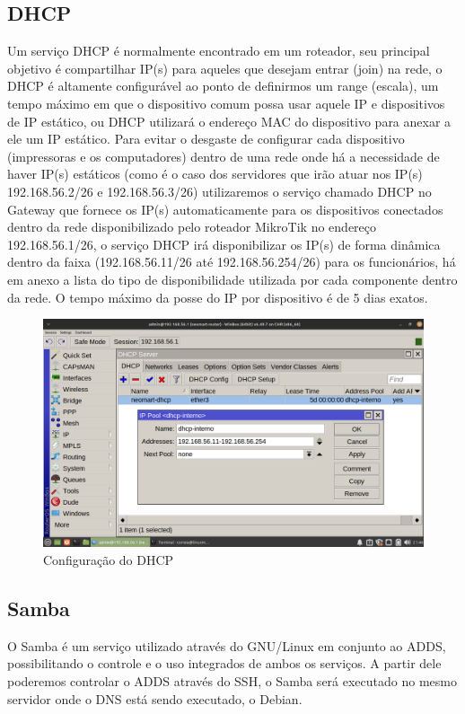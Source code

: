 \documentclass[12pt]{article}
\begin{document}
\subsection{DHCP}
Um serviço DHCP é normalmente encontrado em um roteador, seu principal objetivo é compartilhar IP(s) para aqueles que desejam entrar (join) na rede, o DHCP é altamente configurável ao ponto de definirmos um range (escala), um tempo máximo em que o dispositivo comum possa usar aquele IP e dispositivos de IP estático, ou DHCP utilizará o endereço MAC do dispositivo para anexar a ele um IP estático.
Para evitar o desgaste de configurar cada dispositivo (impressoras e os computadores) dentro de uma rede onde há a necessidade de haver IP(s) estáticos (como é o caso dos servidores que irão atuar nos IP(s) 192.168.56.2/26 e 192.168.56.3/26) utilizaremos o serviço chamado DHCP no Gateway que fornece os IP(s) automaticamente para os dispositivos conectados dentro da rede disponibilizado pelo roteador MikroTik no endereço 192.168.56.1/26, o serviço DHCP irá disponibilizar os IP(s)  de forma dinâmica dentro da faixa (192.168.56.11/26 até 192.168.56.254/26) para os funcionários, há em anexo a lista do tipo de disponibilidade utilizada por cada componente dentro da rede. O tempo máximo da posse do IP por dispositivo é de 5 dias exatos.

\begin{figure}[ht]
\centering
\includegraphics[height=0.5\textwidth]{roteador-dhcp-range.png}
\caption{Configuração do DHCP}
\label{fig:dhcp}
\end{figure}

\subsection{Samba}
O Samba é um serviço utilizado através do GNU/Linux em conjunto ao ADDS, possibilitando o controle e o uso integrados de ambos os serviços. A partir dele poderemos controlar o ADDS através do SSH, o Samba será executado no mesmo servidor onde o DNS está sendo executado, o Debian.
\end{document}
